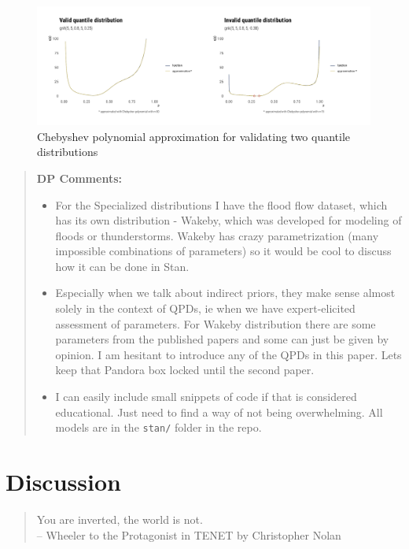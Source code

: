 \documentclass[
  12pt,
]{article}
\begin{document}
\begin{figure}

{\centering \includegraphics{ilbm_article_files/figure-latex/unnamed-chunk-8-1} 

}

\caption{Chebyshev polynomial approximation for validating two quantile distributions}\label{fig:unnamed-chunk-8}
\end{figure}

\begin{quote}
\textbf{DP Comments:}

\begin{itemize}
\item
  For the Specialized distributions I have the flood flow dataset, which has its own distribution - Wakeby, which was developed for modeling of floods or thunderstorms. Wakeby has crazy parametrization (many impossible combinations of parameters) so it would be cool to discuss how it can be done in Stan.
\item
  Especially when we talk about indirect priors, they make sense almost solely in the context of QPDs, ie when we have expert-elicited assessment of parameters. For Wakeby distribution there are some parameters from the published papers and some can just be given by opinion. I am hesitant to introduce any of the QPDs in this paper. Lets keep that Pandora box locked until the second paper.
\item
  I can easily include small snippets of code if that is considered educational. Just need to find a way of not being overwhelming. All models are in the \texttt{stan/} folder in the repo.
\end{itemize}
\end{quote}

\hypertarget{discussion}{%
\section{Discussion}\label{discussion}}

\begin{quotation} 
You are inverted, the world is not. \\ 
-- Wheeler to the Protagonist in TENET by Christopher Nolan
\end{quotation}
\end{document}

